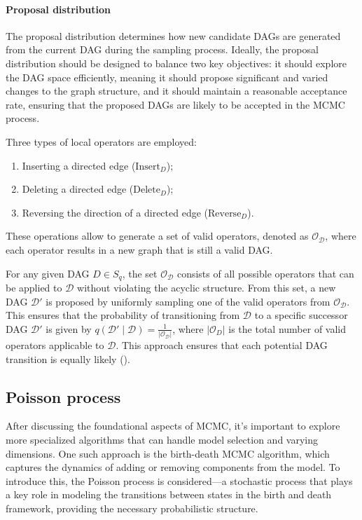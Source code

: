 \documentclass{report}
\begin{document}
\paragraph{Proposal distribution}

The proposal distribution determines how new candidate DAGs are generated from the current DAG during the sampling process. Ideally, the proposal distribution should be designed to balance two key objectives: it should explore the DAG space efficiently, meaning it should propose significant and varied changes to the graph structure, and it should maintain a reasonable acceptance rate, ensuring that the proposed DAGs are likely to be accepted in the MCMC process.

Three types of local operators are employed:

\begin{enumerate}
	\item Inserting a directed edge ($\text{Insert}_D$);
	\item Deleting a directed edge ($\text{Delete}_D$);
	\item Reversing the direction of a directed edge ($\text{Reverse}_D$). 
\end{enumerate}

These operations allow to generate a set of valid operators, denoted as $\mathcal{O}_{\mathcal{D}}$, where each operator results in a new graph that is still a valid DAG.

For any given DAG $D \in S_q$, the set $\mathcal{O}_{\mathcal{D}}$ consists of all possible operators that can be applied to $\mathcal{D}$ without violating the acyclic structure. From this set, a new DAG $\mathcal{D}'$ is proposed by uniformly sampling one of the valid operators from $\mathcal{O}_{\mathcal{D}}$. This ensures that the probability of transitioning from $\mathcal{D}$ to a specific successor DAG $\mathcal{D}'$ is given by $q(\mathcal{D}' \mid \mathcal{D}) = \frac{1}{|\mathcal{O}_{\mathcal{D}}|}$, where $|\mathcal{O}_D|$ is the total number of valid operators applicable to $\mathcal{D}$. This approach ensures that each potential DAG transition is equally likely (\citet{castelletti2022bcdag}). 

\subsection{Poisson process}

After discussing the foundational aspects of MCMC, it's important to explore more specialized algorithms that can handle model selection and varying dimensions. One such approach is the birth-death MCMC algorithm, which captures the dynamics of adding or removing components from the model. To introduce this, the Poisson process is considered—a stochastic process that plays a key role in modeling the transitions between states in the birth and death framework, providing the necessary probabilistic structure.
\end{document}
